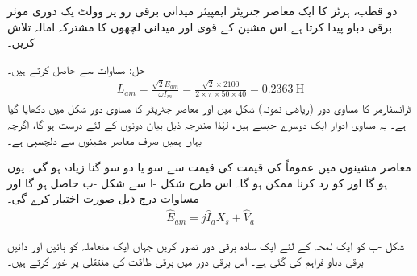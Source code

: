 دو قطب،  ہرٹز کا ایک معاصر جنریٹر  ایمپیئر میدانی برقی رو پر   وولٹ یک دوری موثر برقی دباو پیدا کرتا ہے۔اس مشین کے قوی اور میدانی لچھوں کا مشترکہ امالہ تلاش کریں۔

حل:\quad
	مساوات   سے   حاصل کرتے ہیں۔
\begin{align}
L_{am}=\frac{\sqrt{2} E_{am}}{\omega I_m}=\frac{\sqrt{2}  \times 2100}{2 \times \pi \times 50 \times 40}=\SI{0.2363}{\henry}
\end{align}
%
ٹرانسفارمر کا مساوی دور (ریاضی نمونہ) شکل   میں  اور معاصر جنریٹر کا مساوی دور  شکل  میں دکھایا گیا ہے۔ یہ مساوی ادوار ایک دوسرے جیسے  ہیں، لہٰذا مندرجہ ذیل بیان دونوں کے لئے درست ہو گا، اگرچہ یہاں ہمیں صرف معاصر مشینوں سے دلچسپی ہے۔

معاصر مشینوں میں عموماً  کی قیمت   کی قیمت سے  سو یا دو سو گنا زیادہ ہو گی۔ یوں  ہو گا اور  کو رد کرنا ممکن ہو گا۔ اس طرح  شکل -ا سے شکل -ب حاصل ہو گا اور مساوات  درج ذیل صورت اختیار کرے گی۔
\begin{align}\label{مساوات_معاصر_جنریٹر_دوری_سمتیہ_مساوات_سادہ}
\hat{E}_{am}= j \hat{I}_a X_s +\hat{V}_a
\end{align}

شکل -ب کو  ایک لمحہ کے لئے ایک سادہ برقی دور تصور کریں جہاں  ایک متعاملہ   کو بائیں   اور دائیں   برقی دباو فراہم کی گئی ہے۔ اس برقی دور میں برقی طاقت کی منتقلی پر غور کرتے ہیں۔

